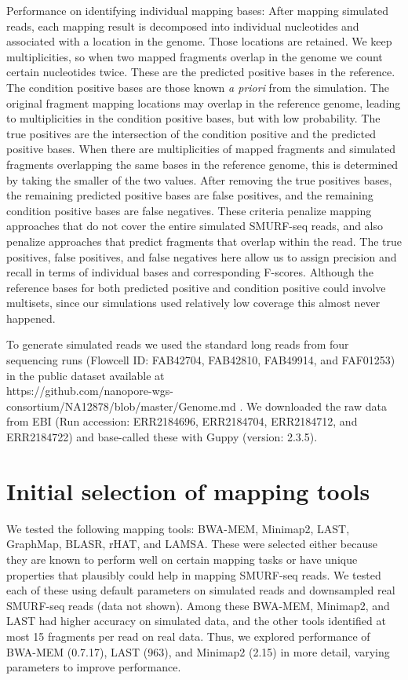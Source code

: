 Performance on identifying individual mapping bases: After mapping
simulated reads, each mapping result is decomposed into individual
nucleotides and associated with a location in the genome. Those
locations are retained. We keep multiplicities, so when two mapped
fragments overlap in the genome we count certain nucleotides twice.
These are the predicted positive bases in the reference.  The condition
positive bases are those known \textit{a priori} from the simulation.
The original fragment mapping locations may overlap in the reference
genome, leading to multiplicities in the condition positive bases, but
with low probability. The true positives are the intersection of the
condition positive and the predicted positive bases. When there are
multiplicities of mapped fragments and simulated fragments overlapping
the same bases in the reference genome, this is determined by taking the
smaller of the two values. After removing the true positives bases, the
remaining predicted positive bases are false positives, and the
remaining condition positive bases are false negatives. These criteria
penalize mapping approaches that do not cover the entire simulated
SMURF-seq reads, and also penalize approaches that predict fragments
that overlap within the read. The true positives, false positives, and
false negatives here allow us to assign precision and recall in terms of
individual bases and corresponding F-scores. Although the reference
bases for both predicted positive and condition positive could involve
multisets, since our simulations used relatively low coverage this
almost never happened.

To generate simulated reads we used the standard long reads from four
sequencing runs (Flowcell ID: FAB42704, FAB42810, FAB49914, and
FAF01253) in the public dataset available at \\
https://github.com/nanopore-wgs-consortium/NA12878/blob/master/Genome.md
\citep{jain2018nanopore,jain2018nanopore_git}. We downloaded the raw data
from EBI (Run accession: ERR2184696, ERR2184704, ERR2184712, and
ERR2184722) and base-called these with Guppy (version: 2.3.5).


\section*{Initial selection of mapping tools}
We tested the following mapping tools: BWA-MEM\citep{li2013aligning},
Minimap2\citep{li2018minimap2}, LAST\citep{kielbasa2011adaptive},
GraphMap\citep{sovic2016fast}, BLASR\citep{chaisson2012mapping},
rHAT\citep{liu2015rhat}, and LAMSA\citep{liu2017lamsa}. These were
selected either because they are known to perform well on certain
mapping tasks or have unique properties that plausibly could help in
mapping SMURF-seq reads. We tested each of these using default
parameters on simulated reads and downsampled real SMURF-seq
reads (data not shown). Among these BWA-MEM, Minimap2, and LAST had
higher accuracy on simulated data, and the other tools identified at
most 15 fragments per read on real data. Thus, we explored performance
of BWA-MEM (0.7.17), LAST (963), and Minimap2 (2.15) in more detail,
varying parameters to improve performance.

